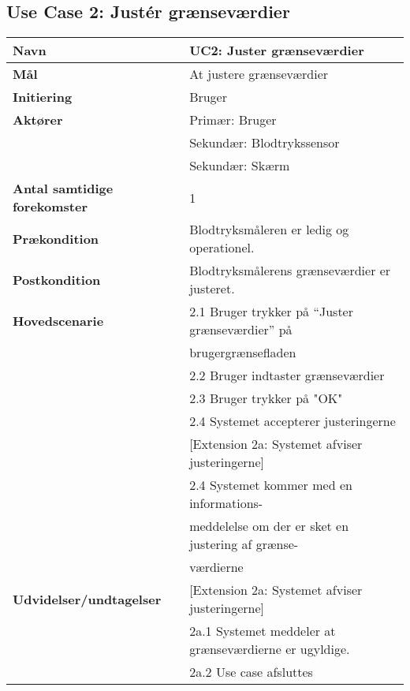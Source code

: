 \subsection{Use Case 2: Justér grænseværdier}
\begin{table}[h!]
	\begin{tabular}{l|l}
		\rowcolor[HTML]{A9D9F9} 
		\textbf{Navn} & UC2: Juster grænseværdier \\ \hline
		\textbf{Mål} & At justere grænseværdier \\ \hline
		\rowcolor[HTML]{A9D9F9} 
		\textbf{Initiering} & Bruger \\ \hline
		\textbf{Aktører} & Primær: Bruger \\
		\textbf{} & Sekundær: Blodtrykssensor \\
		\textbf{} & Sekundær: Skærm \\ \hline
		\rowcolor[HTML]{A9D9F9} 
		\textbf{Antal samtidige forekomster} & 1 \\ \hline
		\textbf{Prækondition} & Blodtryksmåleren er ledig og operationel. \\ \hline
		\rowcolor[HTML]{A9D9F9} 
		\textbf{Postkondition} & Blodtryksmålerens grænseværdier er justeret. \\ \hline
		\textbf{Hovedscenarie} & 2.1 Bruger trykker på “Juster grænseværdier” på \\
		\textbf{} & brugergrænsefladen \\
		\textbf{} & 2.2 Bruger indtaster grænseværdier \\
		\textbf{} & 2.3 Bruger trykker på "OK" \\
		\textbf{} & 2.4 Systemet accepterer justeringerne \\
		\textbf{} & {[}Extension 2a: Systemet afviser justeringerne{]} \\
		\textbf{} & 2.4 Systemet kommer med en informations- \\
		\textbf{} & meddelelse om der er sket en justering af grænse- \\ 
		\textbf{} & værdierne \\\hline
		\rowcolor[HTML]{A9D9F9} 
		\textbf{Udvidelser/undtagelser} & {[}Extension 2a: Systemet afviser justeringerne{]} \\
		\rowcolor[HTML]{A9D9F9} 
		& 2a.1 Systemet meddeler at grænseværdierne er ugyldige. \\
		\rowcolor[HTML]{A9D9F9} 
		& 2a.2 Use case afsluttes
	\end{tabular}
\end{table}